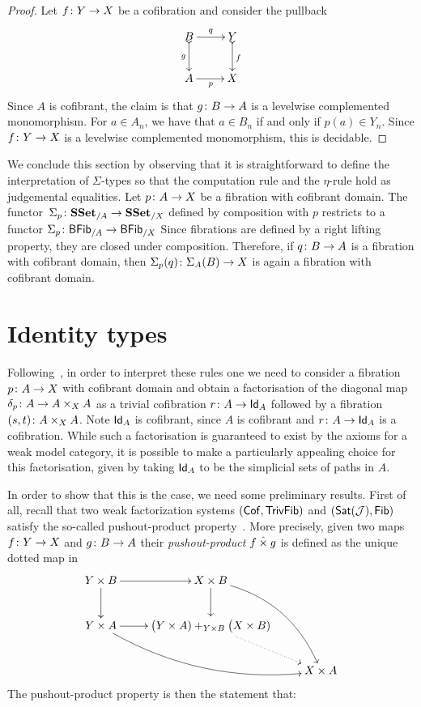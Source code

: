 \documentclass[reqno,10pt,a4paper,oneside,draft]{amsart}
\begin{document}
\begin{proof} Let $f \colon Y \to X$ be a cofibration and consider the pullback
\[
\xymatrix{
B \ar[r]^-{q} \ar@{>->}[d]_-{g} &  Y \ar@{>->}[d]^{f} \\
A \ar[r]_{p} & X}
\]
Since $A$ is cofibrant, the claim is that $g \colon B \rightarrow A$ is a levelwise complemented monomorphism. For $a \in A_n$, we have that $a \in B_n$ if and only if $p(a) \in Y_n$. Since $f \colon Y \rightarrow X$ is a levelwise complemented monomorphism, this is decidable.
\end{proof} 


\begin{remark} 
We conclude this section by observing that it is straightforward to define the interpretation of
$\Sigma$-types so that the computation rule and the $\eta$-rule hold as judgemental equalities. 
Let  $p \colon A \to X$ be a fibration with cofibrant domain. The
functor~$\Sigma_p \colon \mathbf{SSet}_{/A} \to \mathbf{SSet}_{/X}$ defined by
composition with $p$ restricts to a functor
$\Sigma_p \colon \mathsf{BFib}_{/A}  \to \mathsf{BFib}_{/X}$
 Since fibrations are defined by a right lifting property, they are closed
under composition. Therefore, if $q \colon B \to A$ is a fibration with cofibrant domain, then
$\Sigma_p(q) \colon \Sigma_A(B) \to X$ is again a fibration with cofibrant domain.
\end{remark} 



\section{Identity types}

Following~\cite{awodey-warren:homotopy-idtype}, in order to interpret these rules one we need to consider
a fibration $p \colon A \to X$ with cofibrant domain  and obtain a factorisation of the diagonal map $\delta_p \colon A \to A \times_X A$ as a trivial cofibration $r \colon A \to  \mathsf{Id}_A$ followed by a fibration
$(s,t) \colon A \times_X A$. Note  $\mathsf{Id}_A$ is cofibrant, since $A$ is cofibrant and $r \colon A \to \mathsf{Id}_A$ is a cofibration. While such a factorisation is guaranteed to exist by the axioms for a weak model category,
it is possible to make a particularly appealing choice for this factorisation, given by taking $\mathsf{Id}_A$ to be
the simplicial sets of paths in $A$. 

\medskip

In order to show that this is the case, we need some preliminary results. First of all, recall that
two weak factorization systems $(\mathsf{Cof}, \mathsf{TrivFib})$ and $(\mathsf{Sat}(\mathcal{J}), \mathsf{Fib})$
satisfy the so-called pushout-product property~\cite{henry2018wms}. More precisely, given two maps $f \colon Y \rightarrow X$ and $g \colon B \rightarrow A$ their \emph{pushout-product} $f \mathbin{\hat{\times}} g$ is defined as the unique dotted map in
\[
\xymatrix{
Y \times B \ar[r] \ar[d] &  X \times B \ar[d] \ar@/^1.5pc/[ddr] \\
Y \times A \ar[r]  \ar@/_1.5pc/[drr] & \displaystyle \big( Y \times A ) +_{Y \times B} \big( X \times B ) \ar@{.>}[dr]  \\
 & & X \times A }
 \]
The pushout-product property is then the statement that:
\end{document}
